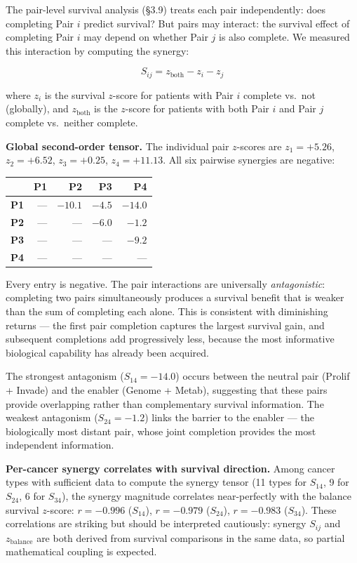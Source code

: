 \documentclass[
  11pt,
]{article}
\newcounter{none} %
\begin{document}
The pair-level survival analysis (§3.9) treats each pair independently:
does completing Pair \(i\) predict survival? But pairs may interact: the
survival effect of completing Pair \(i\) may depend on whether Pair
\(j\) is also complete. We measured this interaction by computing the
synergy:

\[S_{ij} = z_\mathrm{both} - z_i - z_j \tag{7}\]

where \(z_i\) is the survival \(z\)-score for patients with Pair \(i\)
complete vs.~not (globally), and \(z_\mathrm{both}\) is the \(z\)-score
for patients with both Pair \(i\) and Pair \(j\) complete vs.~neither
complete.

\textbf{Global second-order tensor.} The individual pair \(z\)-scores
are \(z_1 = +5.26\), \(z_2 = +6.52\), \(z_3 = +0.25\), \(z_4 = +11.13\).
All six pairwise synergies are negative:

{\def\LTcaptype{none} %
\begin{longtable}[]{@{}lrrrr@{}}
\toprule\noalign{}
& P1 & P2 & P3 & P4 \\
\midrule\noalign{}
\endhead
\bottomrule\noalign{}
\endlastfoot
\textbf{P1} & --- & \(-10.1\) & \(-4.5\) & \(-14.0\) \\
\textbf{P2} & --- & --- & \(-6.0\) & \(-1.2\) \\
\textbf{P3} & --- & --- & --- & \(-9.2\) \\
\textbf{P4} & --- & --- & --- & --- \\
\end{longtable}
}

Every entry is negative. The pair interactions are universally
\emph{antagonistic}: completing two pairs simultaneously produces a
survival benefit that is weaker than the sum of completing each alone.
This is consistent with diminishing returns --- the first pair
completion captures the largest survival gain, and subsequent
completions add progressively less, because the most informative
biological capability has already been acquired.

The strongest antagonism (\(S_{14} = -14.0\)) occurs between the neutral
pair (Prolif + Invade) and the enabler (Genome + Metab), suggesting that
these pairs provide overlapping rather than complementary survival
information. The weakest antagonism (\(S_{24} = -1.2\)) links the
barrier to the enabler --- the biologically most distant pair, whose
joint completion provides the most independent information.

\textbf{Per-cancer synergy correlates with survival direction.} Among
cancer types with sufficient data to compute the synergy tensor (11
types for \(S_{14}\), 9 for \(S_{24}\), 6 for \(S_{34}\)), the synergy
magnitude correlates near-perfectly with the balance survival
\(z\)-score: \(r = -0.996\) (\(S_{14}\)), \(r = -0.979\) (\(S_{24}\)),
\(r = -0.983\) (\(S_{34}\)). These correlations are striking but should
be interpreted cautiously: synergy \(S_{ij}\) and \(z_\mathrm{balance}\)
are both derived from survival comparisons in the same data, so partial
mathematical coupling is expected.
\end{document}
